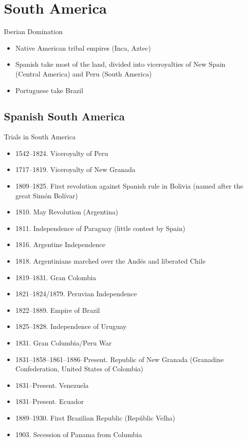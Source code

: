 


\section{South America}
\begin{frame}{Iberian Domination}
	\begin{itemize}
		\item<1->Native American tribal empires (Inca, Aztec)
		\item<2->Spanish take most of the land, divided into viceroyalties of New Spain (Central America) and Peru (South America)
		\item<3->Portuguese take Brazil
	\end{itemize}
\end{frame}

\subsection{Spanish South America}
\begin{frame}{Trials in South America}
	\begin{itemize}
		\item<1-17>1542--1824. Viceroyalty of Peru
		\item<2-17>1717--1819. Viceroyalty of New Granada
		\item<3-17>1809--1825. First revolution against Spanish rule in Bolivia (named after the great Sim{\'o}n Bol{\'i}var)
		\item<4-17>1810. May Revolution (Argentina)
		\item<5-17>1811. Independence of Paraguay (little contest by Spain)
		\item<6-17>1816. Argentine Independence
		\item<7-17>1818. Argentinians marched over the And{\'e}s and liberated Chile
		\item<8-17>1819--1831. Gran Colombia
		\item<9-17>1821--1824/1879. Peruvian Independence
		\item<10-17>1822--1889. Empire of Brazil
		\item<11-17>1825--1828. Independence of Uruguay
		\item<12-17>1831. Gran Columbia/Peru War
		\item<13-17>1831--1858--1861--1886--Present. Republic of New Granada (Granadine Confederation, United States of Colombia)
		\item<14-17>1831--Present. Venezuela
		\item<15-17>1831--Present. Ecuador
		\item<16-17>1889--1930. First Brazilian Republic (Rep{\'u}blic Velha)
		\item<17>1903. Secession of Panama from Columbia
	\end{itemize}
\end{frame}


